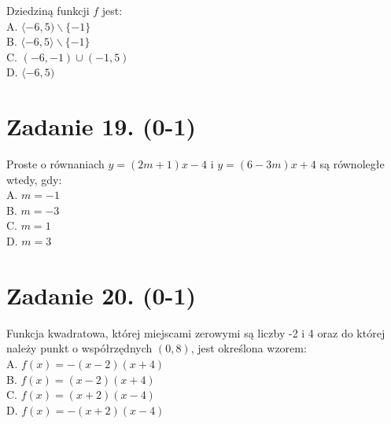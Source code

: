 \documentclass[10pt]{article}
\begin{document}
Dziedziną funkcji \(f\) jest:\\
A. \(\langle-6,5) \backslash\{-1\}\)\\
B. \(\langle-6,5\rangle \backslash\{-1\}\)\\
C. \((-6,-1) \cup(-1,5)\)\\
D. \(\langle-6,5)\)

\section*{Zadanie 19. (0-1)}
Proste o równaniach \(y=(2 m+1) x-4\) i \(y=(6-3 m) x+4\) są równoległe wtedy, gdy:\\
A. \(m=-1\)\\
B. \(m=-3\)\\
C. \(m=1\)\\
D. \(m=3\)

\section*{Zadanie 20. (0-1)}
Funkcja kwadratowa, której miejscami zerowymi są liczby -2 i 4 oraz do której należy punkt o współrzędnych \((0,8)\), jest określona wzorem:\\
A. \(f(x)=-(x-2)(x+4)\)\\
B. \(f(x)=(x-2)(x+4)\)\\
C. \(f(x)=(x+2)(x-4)\)\\
D. \(f(x)=-(x+2)(x-4)\)
\end{document}
